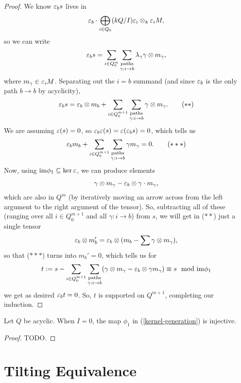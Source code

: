 \documentclass[12pt]{article}
\begin{document}
\begin{proof}
    We know $\varepsilon_b s$ lives in
    \[\varepsilon_b \cdot \bigoplus_{i\in Q_0} (kQ/I)\varepsilon_i \otimes_k \varepsilon_i M,\]
    so we can write
    \[\varepsilon_b s = \sum_{i\in Q^m_0} \sum_{\substack{\text{paths}\\ \gamma: i\to b}} \lambda_{\gamma} \gamma \otimes m_{\gamma},\]
    where $m_\gamma \in \varepsilon_i M$. Separating out the $i=b$ summand (and since $\varepsilon_b$ is the only path $b\to b$ by acyclicity),
    \[\varepsilon_b s = \varepsilon_b \otimes m_b + \sum_{i\in Q^{m+1}_0} \sum_{\substack{\text{paths}\\ \gamma: i\to b}} \gamma \otimes m_{\gamma}. \tag{$**$}\]
    We are assuming $\varepsilon(s)=0$, so $\varepsilon_b\varepsilon(s)=\varepsilon(\varepsilon_b s) = 0$, which tells us
    \[\varepsilon_b m_b + \sum_{i\in Q^{m+1}_0} \sum_{\substack{\text{paths}\\ \gamma: i\to b}} \gamma m_{\gamma} = 0. \tag{$***$}\]
    Now, using $\im \phi_1 \subseteq \ker \eps$, we can produce elements
    \[\gamma \otimes m_{\gamma} - \varepsilon_b \otimes \gamma\cdot m_{\gamma},\]
    which are also in $Q^m$ (by iteratively moving an arrow across from the left argument to the right argument of the tensor). So, subtracting all of these (ranging over all $i\in Q^{m+1}_0$ and all $\gamma:i\to b$) from $s$, we will get in ($**$) just a single tensor
    \[\varepsilon_b \otimes m_b' = \varepsilon_b \otimes (m_b - \sum \gamma\otimes m_\gamma),\]
    so that ($***$) turns into $m_b'=0$, which tells us for
    \[t \defeq s - \sum_{i\in Q^{m+1}_0} \sum_{\substack{\text{paths}\\ \gamma: i\to b}}( \gamma\otimes m_\gamma - \eps_b \otimes \gamma m_{\gamma}) \equiv s \mod{\im \phi_1}\]
    we get as desired $\varepsilon_b t = 0$. So, $t$ is supported on $Q^{m+1}$, completing our induction.
\end{proof}

\begin{prop}
    Let $Q$ be acyclic. When $I=0$, the map $\phi_1$ in (\ref{kernel-generation}) is injective.
\end{prop}
\begin{proof}
    {\color{red} TODO.}
\end{proof}

\section{Tilting Equivalence}
\end{document}
